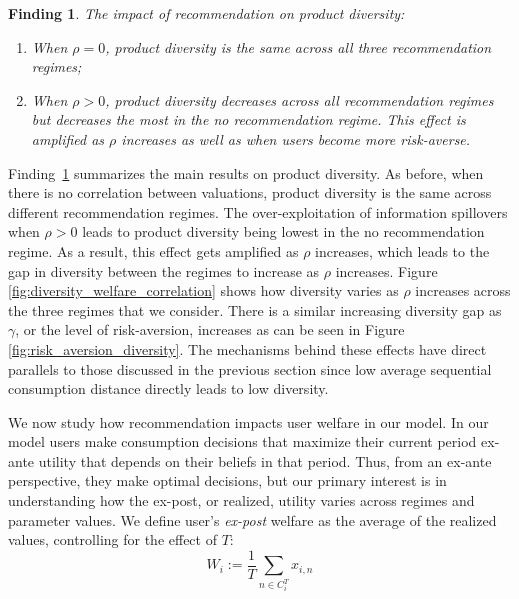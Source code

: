 \documentclass[format=acmsmall, review=false]{acmart}
\newtheorem{finding}{Finding}
\begin{document}
\begin{finding}\label{finding_diversity}
The impact of recommendation on product diversity:
\begin{enumerate}
\item When $\rho = 0$, product diversity is the same across all three recommendation regimes;
\item When $\rho > 0$, product diversity decreases across all recommendation regimes but decreases the most in the no recommendation regime. This effect is amplified as $\rho$ increases as well as when users become more risk-averse.
\end{enumerate}
\end{finding}
\par 
Finding~\ref{finding_diversity} summarizes the main results on product diversity. As before, when there is no correlation between valuations, product diversity is the same across different recommendation regimes. The over-exploitation of information spillovers when $\rho > 0$ leads to product diversity being lowest in the no recommendation regime. As a result, this effect gets amplified as $\rho$ increases, which leads to the gap in diversity between the regimes to increase as $\rho$ increases. Figure \ref{fig:diversity_welfare_correlation} shows how diversity varies as $\rho$ increases across the three regimes that we consider. There is a similar increasing diversity gap as $\gamma$, or the level of risk-aversion, increases as can be seen in Figure \ref{fig:risk_aversion_diversity}. The mechanisms behind these effects have direct parallels to those discussed in the previous section since low average sequential consumption distance directly leads to low diversity.
\par 
We now study how recommendation impacts user welfare in our model. In our model users make consumption decisions that maximize their current period ex-ante utility that depends on their beliefs in that period. Thus, from an ex-ante perspective, they make optimal decisions, but our primary interest is in understanding how the ex-post, or realized, utility varies across regimes and parameter values. We define user's \textit{ex-post} welfare as the average of the realized values, controlling for the effect of $T$:
$$W_i:= \frac{1}{T}\sum_{n \in C_i^T} x_{i,n}$$
\end{document}
